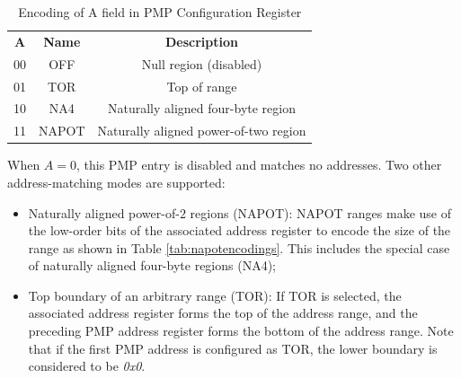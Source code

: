 \begin{table}
  \centering
  \begin{tabular}{|c|c|c|}
    \hline
    \textbf{A}       & \textbf{Name} & \textbf{Description}                  \\
    \hhline {===} 00 & OFF           & Null region (disabled)                \\
    \hline
    01               & TOR           & Top of range                          \\
    \hline
    10               & NA4           & Naturally aligned four-byte region    \\
    \hline
    11               & NAPOT         & Naturally aligned power-of-two region \\
    \hline
  \end{tabular}
  \caption{Encoding of A field in PMP Configuration Register}
  \label{tab:addressmatching}
\end{table}

When $A=0$, this PMP entry is disabled and matches no addresses. Two other address-matching
modes are supported:
\begin{itemize}
  \item Naturally aligned power-of-$2$ regions (NAPOT): NAPOT ranges make use of
    the low-order bits of the associated address register to encode the size of
    the range as shown in Table \ref{tab:napotencodings}. This includes the special
    case of naturally aligned four-byte regions (NA4);

  \item Top boundary of an arbitrary range (TOR): If TOR is selected, the associated
    address register forms the top of the address range, and the preceding PMP
    address register forms the bottom of the address range. Note that if the first
    PMP address is configured as TOR, the lower boundary is considered to be
    \textit{0x0}.
\end{itemize}

